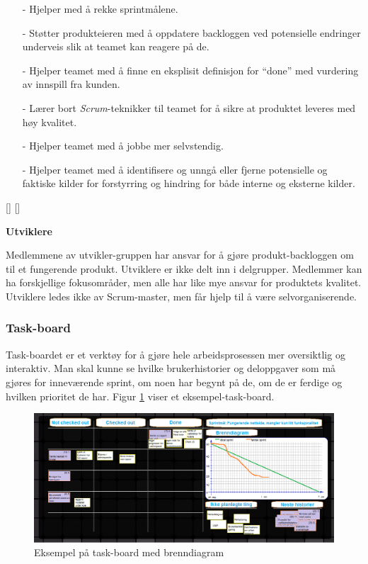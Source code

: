\documentclass[12pt,a4paper,norsk]{article}
\begin{document}
    \begin{itemize}
    \item[-] Hjelper med å rekke sprintmålene.
    \item[-] Støtter produkteieren med å oppdatere backloggen ved potensielle endringer underveis slik at teamet kan reagere på de.
    \item[-]  Hjelper teamet med å finne en eksplisit definisjon for “done” med vurdering av innspill fra kunden.
    \item[-]  Lærer bort \textit{Scrum}-teknikker til teamet for å sikre at produktet leveres med høy kvalitet.
    \item[-]  Hjelper teamet med å jobbe mer selvstendig.
    \item[-]  Hjelper teamet med å identifisere og unngå eller fjerne             potensielle og faktiske kilder for forstyrring og hindring for både interne og eksterne kilder.
    \end{itemize}
    
    [\cite{scrummaster}]
    [\cite{scrummasterrolle}]
    
    \bigskip \noindent \textbf{Utviklere}
    
    Medlemmene av utvikler-gruppen har ansvar for å gjøre produkt-backloggen om til et fungerende produkt. Utviklere er ikke delt inn i delgrupper. Medlemmer kan ha forskjellige fokusområder, men alle har like mye ansvar for produktets kvalitet. Utviklere ledes ikke av Scrum-master, men får hjelp til å være selvorganiserende.
	
	\subsubsection{Task-board}
	Task-boardet er et verktøy for å gjøre hele arbeidsprosessen mer oversiktlig og interaktiv. Man skal kunne se hvilke brukerhistorier og deloppgaver som må gjøres for inneværende sprint, om noen har begynt på de, om de er ferdige og hvilken prioritet de har. Figur \ref{fig:task-board} viser et eksempel-task-board.
    
    \begin{figure}[h!]
 		\includegraphics[width=\linewidth]{img/task-board.png}
  		\caption{Eksempel på task-board med brenndiagram}
  		\label{fig:task-board}
	\end{figure}
	
\end{document}
